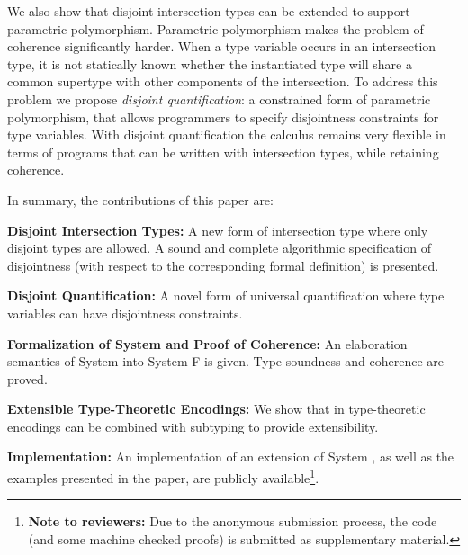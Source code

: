 We also show that disjoint intersection types can be extended to
support parametric polymorphism. Parametric polymorphism makes the
problem of coherence significantly harder. When a type variable occurs
in an intersection type, it is not statically known whether the
instantiated type will share a common supertype with other components
of the intersection. To address this problem we propose
\emph{disjoint quantification}: a constrained form of parametric
polymorphism, that allows programmers to specify disjointness
constraints for type variables. With disjoint quantification the
calculus remains very flexible in terms of programs that can be
written with intersection types, while retaining coherence.

In summary, the contributions of this paper are:

\begin{itemize*}

\item {\bf Disjoint Intersection Types:} A new form of intersection
  type where only disjoint types are allowed. A sound and complete
  algorithmic specification of disjointness (with respect to the
  corresponding formal definition) is presented.

\item {\bf Disjoint Quantification:} A novel form of universal
quantification where type variables can have disjointness
constraints.

\item {\bf Formalization of System \namedis and Proof of Coherence:} An
  elaboration semantics of System \namedis into System F is
  given. Type-soundness and coherence are proved.

\item {\bf Extensible Type-Theoretic Encodings:} We show that in \namedis
 type-theoretic encodings can be combined with subtyping to provide extensibility.

\item {\bf Implementation:} An implementation of an
  extension of System \namedis, as well as the examples presented in the
  paper, are publicly available\footnote{{\bf Note to reviewers:} Due
    to the anonymous submission process, the code (and some machine
    checked proofs) is submitted as supplementary material.}.

\end{itemize*}

